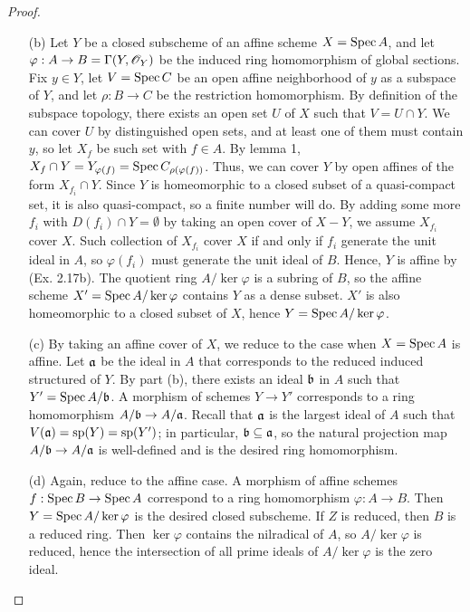 \documentclass{article}
\begin{document}
\begin{enumerate} [label=\textbf{\arabic*.}, leftmargin=0em]
\begin{proof}
\begin{itemize} [leftmargin=0cm]
    \item[(b)] Let $Y$ be a closed subscheme of an affine scheme $X = \operatorname{Spec}{A}$, and let $\varphi : A \to B = \Gamma(Y, \mathscr{O}_Y)$ be the induced ring homomorphism of global sections. Fix $y \in Y$, let $V = \operatorname{Spec}{C}$ be an open affine neighborhood of $y$ as a subspace of $Y$, and let $\rho : B \to C$ be the restriction homomorphism. By definition of the subspace topology, there exists an open set $U$ of $X$ such that $V = U \cap Y$. We can cover $U$ by distinguished open sets, and at least one of them must contain $y$, so let $X_f$ be such set with $f \in A$. By lemma 1, $X_f \cap Y = Y_{\varphi(f)} = \operatorname{Spec}{C_{\rho(\varphi(f))}}$. Thus, we can cover $Y$ by open affines of the form $X_{f_i} \cap Y$. Since $Y$ is homeomorphic to a closed subset of a quasi-compact set, it is also quasi-compact, so a finite number will do. By adding some more $f_i$ with $D(f_i) \cap Y = \emptyset$ by taking an open cover of $X - Y$, we assume $X_{f_i}$ cover $X$. Such collection of $X_{f_i}$ cover $X$ if and only if $f_i$ generate the unit ideal in $A$, so $\varphi(f_i)$ must generate the unit ideal of $B$. Hence, $Y$ is affine by (Ex. 2.17b). The quotient ring $A / \ker{\varphi}$ is a subring of $B$, so the affine scheme $X' = \operatorname{Spec}{A / \ker{\varphi}}$ contains $Y$ as a dense subset. $X'$ is also homeomorphic to a closed subset of $X$, hence $Y = \operatorname{Spec}{A / \ker{\varphi}}$.

    \item[(c)] By taking an affine cover of $X$, we reduce to the case when $X = \operatorname{Spec}{A}$ is affine. Let $\mathfrak{a}$ be the ideal in $A$ that corresponds to the reduced induced structured of $Y$. By part (b), there exists an ideal $\mathfrak{b}$ in $A$ such that $Y' = \operatorname{Spec}{A / \mathfrak{b}}$. A morphism of schemes $Y \to Y'$ corresponds to a ring homomorphism $A / \mathfrak{b} \to A / \mathfrak{a}$. Recall that $\mathfrak{a}$ is the largest ideal of $A$ such that $V(\mathfrak{a}) = \text{sp}(Y) = \text{sp}(Y')$; in particular, $\mathfrak{b} \subseteq \mathfrak{a}$, so the natural projection map $A / \mathfrak{b} \to A / \mathfrak{a}$ is well-defined and is the desired ring homomorphism.

    \item[(d)] Again, reduce to the affine case. A morphism of affine schemes $f : \operatorname{Spec}{B} \to \operatorname{Spec}{A}$ correspond to a ring homomorphism $\varphi : A \to B$. Then $Y = \operatorname{Spec}{A / \ker{\varphi}}$ is the desired closed subscheme. If $Z$ is reduced, then $B$ is a reduced ring. Then $\ker{\varphi}$ contains the nilradical of $A$, so $A / \ker{\varphi}$ is reduced, hence the intersection of all prime ideals of $A / \ker{\varphi}$ is the zero ideal.
   \end{itemize} 
\end{proof}


\end{enumerate}
\end{document}
